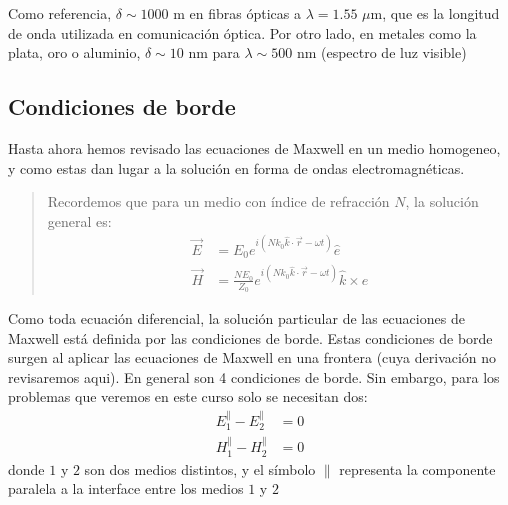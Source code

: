 \documentclass[letterpaper,10pt,english]{jupyterBook}
\begin{document}
\sphinxAtStartPar
Como referencia, \(\delta\sim 1000\) m en fibras ópticas a \(\lambda = 1.55\) \(\mu\)m, que es la longitud de onda utilizada en comunicación óptica. Por otro lado, en metales como la plata, oro o aluminio, \(\delta\sim 10\) nm para \(\lambda \sim 500\) nm (espectro de luz visible)


\subsection{Condiciones de borde}
\label{\detokenize{2_ondas_EM_en_la_materia/2_ondas_EM_en_la_materia:condiciones-de-borde}}
\sphinxAtStartPar
Hasta ahora hemos revisado las ecuaciones de Maxwell en un medio homogeneo, y como estas dan lugar a la solución en forma de ondas electromagnéticas.
\begin{quote}

\sphinxAtStartPar
Recordemos que para un medio con índice de refracción \(N\), la solución general es:
\begin{align*}
\vec{E} &= E_0 e^{i\left(Nk_0\hat{k}\cdot\vec{r} - \omega t\right)} \hat{e} \\
\vec{H} &= \frac{NE_0}{Z_0} e^{i\left(Nk_0\hat{k}\cdot\vec{r} - \omega t\right)} \hat{k}\times\hat{e}
\end{align*}\end{quote}

\sphinxAtStartPar
{}

\sphinxAtStartPar
Como toda ecuación diferencial, la solución particular de las ecuaciones de Maxwell está definida por las condiciones de borde. Estas condiciones de borde surgen al aplicar las ecuaciones de Maxwell en una frontera (cuya derivación no revisaremos aqui). En general son 4 condiciones de borde. Sin embargo, para los problemas que veremos en este curso solo se necesitan dos:
\label{equation:2_ondas_EM_en_la_materia/2_ondas_EM_en_la_materia:b3ea5a4d-6d37-4b1d-8dce-a50a48b162ac}\begin{align}
E^{\parallel}_1 - E^{\parallel}_2 &= 0 \\
H^{\parallel}_1 - H^{\parallel}_2 &= 0
\end{align}
\sphinxAtStartPar
donde \(1\) y \(2\) son dos medios distintos, y el símbolo \(\parallel\) representa la componente paralela a la interface entre los medios \(1\) y \(2\)
\begin{quote}

\sphinxAtStartPar
{}
\end{quote}
\end{document}
